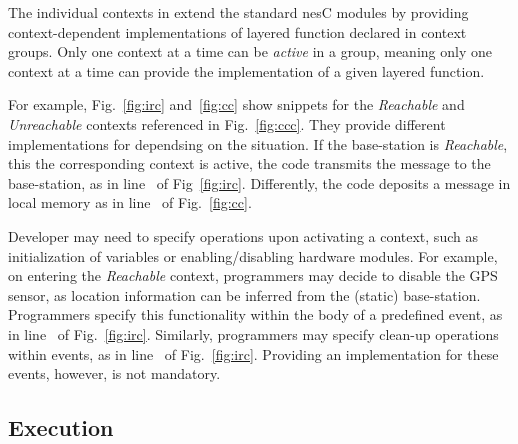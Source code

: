 

The individual contexts in \conesc extend the standard nesC modules by
providing context-dependent implementations of layered function
declared in context groups. Only one context at a time can be
\emph{active} in a group, meaning only one context at a time can
provide the implementation of a given layered function.

For example, Fig.~\ref{fig:irc} and~\ref{fig:cc} show \conesc snippets
for the \emph{Reachable} and \emph{Unreachable} contexts referenced in
Fig.~\ref{fig:ccc}. They provide different implementations for
 dependsing on the situation. If the base-station is
\emph{Reachable}, this the corresponding context is active, the code
transmits the message to the base-station, as in
line~ of Fig~\ref{fig:irc}. Differently, the code
deposits a message in local memory as in line~ of
Fig.~\ref{fig:cc}.

Developer may need to specify operations upon activating a context,
such as initialization of variables or enabling/disabling hardware
modules. For example, on entering the \emph{Reachable} context,
programmers may decide to disable the GPS sensor, as location
information can be inferred from the (static)
base-station. Programmers specify this functionality within the body
of a predefined  event, as in
line~ of Fig.~\ref{fig:irc}. Similarly,
programmers may specify clean-up operations within 
events, as in line~ of
Fig.~\ref{fig:irc}.  Providing an implementation for these events,
however, is not mandatory.

\subsection{Execution}\label{subsec:usage}



